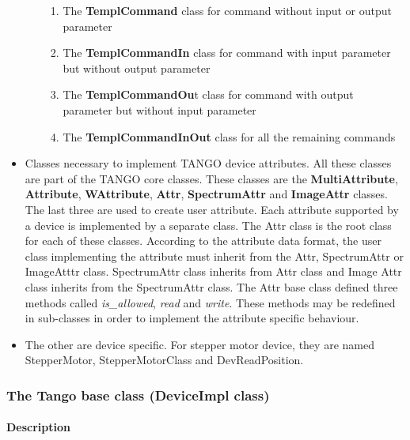 \begin{itemize}
\begin{enumerate}
\begin{enumerate}
\item The \textbf{TemplCommand} class for command without
input or output parameter
\item The \textbf{TemplCommandIn} class for command
with input parameter but without output parameter
\item The \textbf{TemplCommandOu}t class for command
with output parameter but without input parameter
\item The \textbf{TemplCommandInOut} class for
all the remaining commands
\end{enumerate}
\end{enumerate}
\item Classes necessary to implement TANGO device attributes.
All these classes are part of the TANGO core classes. These classes
are the \textbf{MultiAttribute}, \textbf{Attribute},
\textbf{WAttribute}, \textbf{Attr},
\textbf{SpectrumAttr} and \textbf{ImageAttr}
classes. The last three are used to create user attribute. Each attribute
supported by a device is implemented by a separate class. The Attr
class is the root class for each of these classes. According to the
attribute data format, the user class implementing the attribute must
inherit from the Attr, SpectrumAttr or ImageAtttr class. SpectrumAttr
class inherits from Attr class and Image Attr class inherits from
the SpectrumAttr class. The Attr base class defined three methods
called \emph{is\_allowed}, \emph{read}
and \emph{write}. These methods may be redefined in
sub-classes in order to implement the attribute specific behaviour.
\item The other are device specific. For stepper motor device, they are
named StepperMotor, StepperMotorClass and DevReadPosition.
\end{itemize}

\subsubsection{The Tango base class (DeviceImpl class)}

\paragraph{Description}

